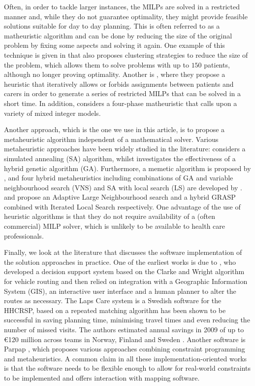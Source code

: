 \documentclass[a4paper,11pt,authoryear]{elsarticle}
\begin{document}
Often, in order to tackle larger instances, the MILPs are solved in a restricted manner and, while they do not guarantee optimality, they might provide feasible solutions suitable for day to day planning. This is often referred to as a matheuristic algorithm and can be done by reducing the size of the original problem by fixing some aspects and solving it again. One example of this technique is given in \cite{rasmussen2012} that also proposes clustering strategies to reduce the size of the problem, which allows them to solve problems with up to $150$ patients, although no longer proving optimality. Another is \cite{bredstrom2008}, where they propose a heuristic that iteratively allows or forbids assignments between patients and carers in order to generate a series of restricted MILPs that can be solved in a short time. In addition, \citet{nikzad2021} considers a four-phase matheuristic that calls upon a variety of mixed integer models.

Another approach, which is the one we use in this article, is to propose a metaheuristic algorithm independent of a mathematical solver. Various metaheuristic approaches have been widely studied in the literature: \citet{manavizadeh2020} considers a simulated annealing (SA) algorithm, whilst \citet{nasir2020} investigates the effectiveness of a hybrid genetic algorithm (GA). Furthermore, a memetic algorithm is proposed by \citet{shahnejat2021}, and four hybrid metaheuristics including combinations of GA and variable neighbourhood search (VNS) and SA with local search (LS) are developed by \citet{liu2021}. \cite{mankowska2014} and \cite{aithaddadene2016} propose an Adaptive Large Neighbourhood search and a hybrid GRASP combined with Iterated Local Search respectively. One advantage of the use of heuristic algorithms is that they do not require availability of a (often commercial) MILP solver, which is unlikely to be available to health care professionals. 

Finally, we look at the literature that discusses the software implementation of the solution approaches in practice. One of the earliest works is due to \cite{begur1997}, who developed a decision support system based on the Clarke and Wright algorithm \citep{clarke1964} for vehicle routing and then relied on integration with a Geographic Information System (GIS), an interactive user interface and a human planner to alter the routes as necessary. The Laps Care system \citep{eveborn2006, eveborn2009} is a Swedish software for the HHCRSP, based on a repeated matching algorithm has been shown to be successful in saving planning time, minimising travel times and even reducing the number of missed visits. The authors estimated annual savings in 2009 of up to \euro 120 million across teams in Norway, Finland and Sweden \citep{eveborn2009}. Another software is Parpap \citep{bertels2006}, which proposes various approaches combining constraint programming and metaheuristics. A common claim in all these implementation-oriented works is that the software needs to be flexible enough to allow for real-world constraints to be implemented and offers interaction with mapping software.
\end{document}
